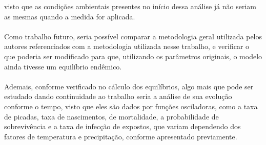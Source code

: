 visto que as condições ambientais presentes no início dessa análise
já não seriam as mesmas quando a medida for aplicada.
\\\\
Como trabalho futuro, seria possível comparar a metodologia geral utilizada pelos autores 
referenciados com a metodologia utilizada nesse trabalho, e verificar 
o que poderia ser modificado para que, utilizando os parâmetros originais, o modelo
ainda tivesse um equilíbrio endêmico.
\\\\ 
Ademais, conforme verificado no cálculo dos equilíbrios, algo mais que pode ser 
estudado dando continuidade ao trabalho seria a análise de sua evolução conforme o tempo, visto que eles são dados 
por funções osciladoras, como a taxa de picadas, taxa de nascimentos, de mortalidade, 
a probabilidade de sobrevivência e a taxa de infecção de expostos, que variam dependendo
dos fatores de temperatura e precipitação, conforme apresentado previamente.

